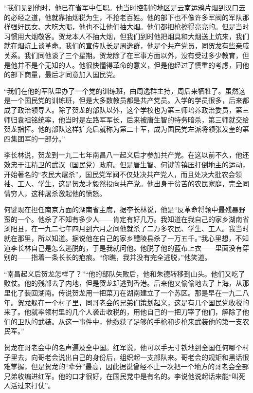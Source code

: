 \documentclass[10pt]{book}
\begin{document}
“我们见到他时，他已在省军中任职。他当时控制的地区是云南运鸦片烟到汉口去的必经之道，他就靠抽烟税为生，不抢老百姓。他的部下也不像许多军阀的军队那样强奸民女、大吃大喝，他也不让他们抽大烟。他们都把枪擦得亮亮的。但是当时习惯用大烟敬客。贺龙本人不抽大烟，但我们到时他把烟具和大烟送上炕来，我们就在烟炕上谈革命。我们的宣传队长是周逸群，他是个共产党员，同贺龙有些亲戚关系。我们同他谈了三个星期。贺龙除了在军事方面以外，没有受过多少教育，但是他并不是个无知的人。他很快懂得革命的意义，但是他经过了慎重的考虑，同他的部下商量，最后才同意加入国民党。

“我们在他的军队里办了一个党的训练班，由周逸群主持，周后来牺牲了。虽然这是一个国民党的训练班，但是大多数教员都是共产党员。入学的学员很多，后来都成了政治领导人。除了贺龙的部队以外，这个学校也为第三师培养政治委员，第三师归袁祖铭统率，他当时是左路军军长，后来被唐生智的特务暗杀，第三师就交给贺龙指挥。他的部队这样扩充后就称为第二十军，成为国民党左派将领张发奎的第四集团军的一部分。”

李长林说，贺龙到一九二七年南昌八一起义后才参加共产党。在这以前不久，他还效忠于汪精卫的武汉（国民党）政府。但是唐生智、何键等镇压打倒地主的运动，开始著名的“农民大屠杀”，国民党军阀不仅处决共产党人，而且处决大批农会领袖、工人、学生，这是贺龙才毅然投向共产党。他出身于贫苦的农民家庭，完全同情穷人，这种屠杀激起他的愤怒。

何键现在担任南京方面的湖南省主席，据李长林说，他是“反革命将领中最残暴野蛮的一个。他杀了不知有多少人——肯定有好几万。我知道在我自己的家乡湖南省浏阳县，在一九二七年四月到六月之间他就杀了二万多农民、学生、工人。我当时就在那里，所以知道。据说他在自己的家乡醴陵县杀了一万五千。”我心里想，不知道李长林自己是怎么逃脱的，于是我就问他。他脱了他的蓝布上衣——里面没有穿别的——指着一条长长的疤痕。“你瞧，我并没有完全逃脱，”他笑道。

“南昌起义后贺龙怎样了？”“他的部队失败后，他和朱德转移到山头。他们又吃了败仗。他的残部去了内地，但是贺龙却逃到香港。后来他又偷偷地去了上海，从那里化了装回湖南。传说贺龙用一把菜刀在湖南建立了一个苏区。那是早在一九二八年。贺龙躲在一个村子里，同哥老会的兄弟们策划起义，这是有几个国民党收税的来了。他就率领村里的几个人袭击收税的，用他自己的一把刀宰了他们，解除了他们的卫队的武装。从这一事件中，他缴获了足够的手枪和步枪来武装他的第一支农民军。”

贺龙在哥老会中的名声遍及全中国。红军说，他可以手无寸铁地到全国任何哪个村子里去，向哥老会说出自己的身份后，组织起一支部队来。哥老会的规矩和黑话很难掌握，但是贺龙的“辈分”最高，因此据说曾经不止一次把一个地方的哥老会全部兄弟收编进红军。他的口才很好，在国民党中是有名的。李说他说起话来能“叫死人活过来打仗”。
\end{document}
